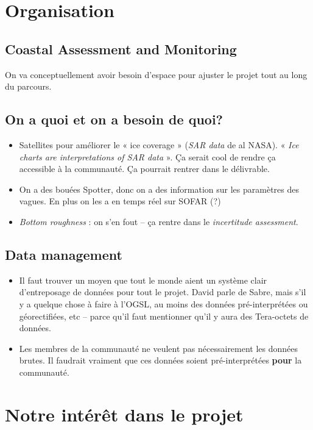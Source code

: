 \documentclass[10pt]{article}
\numberwithin{equation}{section}
\begin{document}
\section{Organisation}
\label{sec:orgd90e304}

\subsection{Coastal Assessment and Monitoring}
\label{sec:org189d0e6}

On va conceptuellement avoir besoin d'espace pour ajuster le projet tout au long du parcours.
\subsection{On a quoi et on a besoin de quoi?}
\label{sec:org84ad2f9}
\begin{itemize}
\item Satellites pour améliorer le « ice coverage » (\emph{SAR data} de al NASA).
« \emph{Ice charts are interpretations of SAR data} ». Ça serait cool de rendre ça accessible à la communauté. Ça pourrait rentrer dans le délivrable.
\item On a des bouées Spotter, donc on a des information sur les paramètres des vagues.
En plus on les a en temps réel sur SOFAR (?)
\item \emph{Bottom roughness} : on s'en fout -- ça rentre dans le \emph{incertitude assessment}.
\end{itemize}
\subsection{Data management}
\label{sec:orga06e296}
\begin{itemize}
\item Il faut trouver un moyen que tout le monde aient un système clair d'entreposage de données pour tout le projet. David parle de Sabre, mais s'il y a quelque chose à faire à l'OGSL, au moins des données pré-interprétées ou géorectifiées, etc -- parce qu'il faut mentionner qu'il y aura des Tera-octets de données.
\item Les membres de la communauté ne veulent pas nécessairement les données brutes. Il faudrait vraiment que ces données soient pré-interprétées \textbf{pour} la communauté.
\end{itemize}
\section{Notre intérêt dans le projet}
\label{sec:org841b834}
\end{document}
